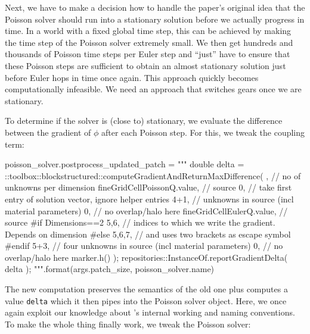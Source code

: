 \noindent
Next, we have to make a decision how to handle the paper's original idea that
the Poisson solver should run into a stationary solution before we actually
progress in time.
In a world with a fixed global time step, this can be achieved by making the
time step of the Poisson solver extremely small. 
We then get hundreds and thousands of Poisson time steps per Euler step and
``just'' have to ensure that these Poisson steps are sufficient to obtain an
almost stationary solution just before Euler hops in time once again.
This approach quickly becomes computationally infeasible.
We need an approach that switches gears once we are stationary.


To determine if the solver is (close to) stationary, we evaluate the difference 
between the gradient of $\phi$ after each Poisson step.
For this, we tweak the coupling term: 

\begin{code}
poisson_solver.postprocess_updated_patch = """
 double delta = 
 ::toolbox::blockstructured::computeGradientAndReturnMaxDifference(
   {},      // no of unknowns per dimension
   fineGridCellPoissonQ.value, // source
   0,       // take first entry of solution vector, ignore helper entries
   4+1,     // unknowns in source (incl material parameters)
   0,       // no overlap/halo here
   fineGridCellEulerQ.value, // source
   #if Dimensions==2
   {{5,6}},   // indices to which we write the gradient. Depends on dimension
   #else
   {{5,6,7}}, // and uses two brackets as escape symbol
   #endif
   5+3,     // four unknowns in source (incl material parameters)
   0,       // no overlap/halo here
   marker.h()
 );
 repositories::InstanceOf{}.reportGradientDelta( delta );
""".format(args.patch_size, poisson_solver.name)
\end{code} 

\noindent
The new computation preserves the semantics of the old one plus computes a value \texttt{delta} 
which it then pipes into the Poisson solver object.
Here, we once again exploit our knowledge about \ExaHyPE's internal working and naming conventions.
To make the whole thing finally work, we tweak the Poisson solver:

